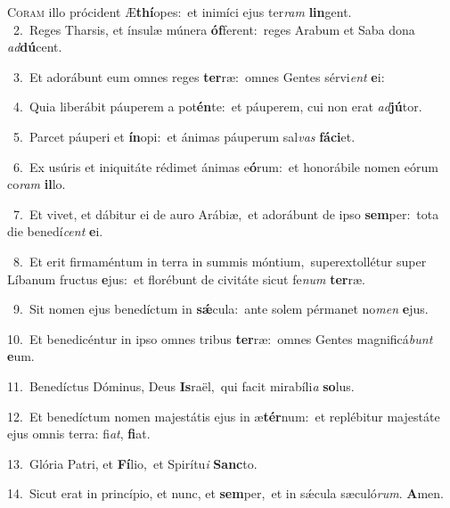 \lettrine{\initial\textcolor{\initialcolor}{C}}{oram} illo prócident Æ\-\textbf{thí}\-opes:~\star et inimíci ejus ter\textit{ram} \textbf{lin}\-gent.\\
{\numbfont\textcolor{\numbcolor}{~2.}}~Reges Tharsis, et ínsulæ múnera \textbf{óf}\-ferent:~\star reges Arabum et Saba dona \textit{ad}\-\textbf{dú}cent.\par
{\numbfont\textcolor{\numbcolor}{~3.}}~Et adorábunt eum omnes reges \textbf{ter}\-ræ:~\star omnes Gentes sérvi\textit{ent} \textbf{e}\-i:\par
{\numbfont\textcolor{\numbcolor}{~4.}}~Quia liberábit páuperem a pot\-\textbf{én}\-te:~\star et páuperem, cui non erat \textit{ad}\-\textbf{jú}tor.\par
{\numbfont\textcolor{\numbcolor}{~5.}}~Parcet páuperi et \textbf{ín}\-opi:~\star et ánimas páuperum sal\textit{vas} \textbf{fá}\-\textbf{ci}et.\par
{\numbfont\textcolor{\numbcolor}{~6.}}~Ex usúris et iniquitáte rédimet ánimas e\-\textbf{ó}\-rum:~\star et honorábile nomen eórum co\textit{ram} \textbf{il}\-lo.\par
{\numbfont\textcolor{\numbcolor}{~7.}}~Et vivet, et dábitur ei de auro Arábiæ,~\dagger et adorábunt de ipso \textbf{sem}\-per:~\star tota die benedí\textit{cent} \textbf{e}\-i.\par
{\numbfont\textcolor{\numbcolor}{~8.}}~Et erit firmaméntum in terra in summis móntium,~\dagger superextollétur super Líbanum fructus \textbf{e}\-jus:~\star et florébunt de civitáte sicut fe\textit{num} \textbf{ter}\-ræ.\par
{\numbfont\textcolor{\numbcolor}{~9.}}~Sit nomen ejus benedíctum in \textbf{sǽ}\-cula:~\star ante solem pérmanet no\textit{men} \textbf{e}\-jus.\par
{\numbfont\textcolor{\numbcolor}{10.}}~Et benedicéntur in ipso omnes tribus \textbf{ter}\-ræ:~\star omnes Gentes magnificá\textit{bunt} \textbf{e}\-um.\par
{\numbfont\textcolor{\numbcolor}{11.}}~Benedíctus Dóminus, Deus \textbf{Is}\-raël,~\star qui facit mirabíli\textit{a} \textbf{so}\-lus.\par
{\numbfont\textcolor{\numbcolor}{12.}}~Et benedíctum nomen majestátis ejus in æ\-\textbf{tér}\-num:~\star et replébitur majestáte ejus omnis terra: fi\-\textit{at}\-, \textbf{fi}\-at.\par
{\numbfont\textcolor{\numbcolor}{13.}}~Glória Patri, et \textbf{Fí}\-lio,~\star et Spirítu\textit{i} \textbf{Sanc}\-to.\par
{\numbfont\textcolor{\numbcolor}{14.}}~Sicut erat in princípio, et nunc, et \textbf{sem}\-per,~\star et in sǽcula sæculó\-\textit{rum}\-. \textbf{A}\-men.\par
